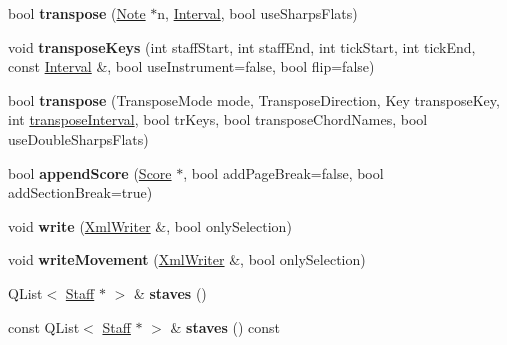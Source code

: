 \begin{DoxyCompactItemize}
\item 
\mbox{\label{class_ms_1_1_score_aea491e23eb7398f6f414c8262a79f5db}} 
bool {\bfseries transpose} (\hyperlink{class_ms_1_1_note}{Note} $\ast$n, \hyperlink{struct_ms_1_1_interval}{Interval}, bool use\+Sharps\+Flats)
\item 
\mbox{\label{class_ms_1_1_score_af4745c70eb31a06becb6220c28f0f8b2}} 
void {\bfseries transpose\+Keys} (int staff\+Start, int staff\+End, int tick\+Start, int tick\+End, const \hyperlink{struct_ms_1_1_interval}{Interval} \&, bool use\+Instrument=false, bool flip=false)
\item 
\mbox{\label{class_ms_1_1_score_a7eefd9fdb540ecc3da8ec892c66610f2}} 
bool {\bfseries transpose} (Transpose\+Mode mode, Transpose\+Direction, Key transpose\+Key, int \hyperlink{namespace_ms_aab75a202cfc63fdfe7e31f65ce0f7f08}{transpose\+Interval}, bool tr\+Keys, bool transpose\+Chord\+Names, bool use\+Double\+Sharps\+Flats)
\item 
\mbox{\label{class_ms_1_1_score_af3fdf5391d820ad3377bc9e0e44601bc}} 
bool {\bfseries append\+Score} (\hyperlink{class_ms_1_1_score}{Score} $\ast$, bool add\+Page\+Break=false, bool add\+Section\+Break=true)
\item 
\mbox{\label{class_ms_1_1_score_a5963f11eed3489c1de114aabb35cabe7}} 
void {\bfseries write} (\hyperlink{class_ms_1_1_xml_writer}{Xml\+Writer} \&, bool only\+Selection)
\item 
\mbox{\label{class_ms_1_1_score_af64430c4612b9826184ee4417455b085}} 
void {\bfseries write\+Movement} (\hyperlink{class_ms_1_1_xml_writer}{Xml\+Writer} \&, bool only\+Selection)
\item 
\mbox{\label{class_ms_1_1_score_aaa9eed88d78a41f6cef322c1e3b663a8}} 
Q\+List$<$ \hyperlink{class_ms_1_1_staff}{Staff} $\ast$ $>$ \& {\bfseries staves} ()
\item 
\mbox{\label{class_ms_1_1_score_ac4baf4f5709a6b685a04522b9cb8b80b}} 
const Q\+List$<$ \hyperlink{class_ms_1_1_staff}{Staff} $\ast$ $>$ \& {\bfseries staves} () const
\item 

\end{DoxyCompactItemize}
